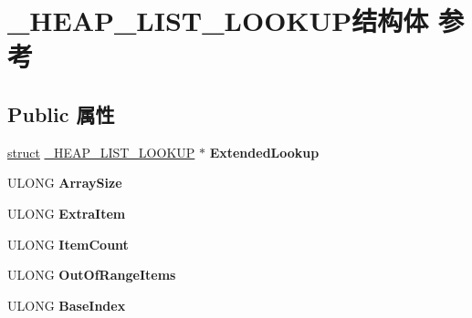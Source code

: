 \hypertarget{struct___h_e_a_p___l_i_s_t___l_o_o_k_u_p}{}\section{\+\_\+\+H\+E\+A\+P\+\_\+\+L\+I\+S\+T\+\_\+\+L\+O\+O\+K\+U\+P结构体 参考}
\label{struct___h_e_a_p___l_i_s_t___l_o_o_k_u_p}
\subsection*{Public 属性}
\begin{DoxyCompactItemize}
\item 
\mbox{\label{struct___h_e_a_p___l_i_s_t___l_o_o_k_u_p_a74a45acb81087ff88ffbf8f173f3f0d5}} 
\hyperlink{interfacestruct}{struct} \hyperlink{struct___h_e_a_p___l_i_s_t___l_o_o_k_u_p}{\+\_\+\+H\+E\+A\+P\+\_\+\+L\+I\+S\+T\+\_\+\+L\+O\+O\+K\+UP} $\ast$ {\bfseries Extended\+Lookup}
\item 
\mbox{\label{struct___h_e_a_p___l_i_s_t___l_o_o_k_u_p_aa0c1d954dd0366df30343ef7b4e45460}} 
U\+L\+O\+NG {\bfseries Array\+Size}
\item 
\mbox{\label{struct___h_e_a_p___l_i_s_t___l_o_o_k_u_p_a0a473dd9b6c07f2d1fa254ce74c97f02}} 
U\+L\+O\+NG {\bfseries Extra\+Item}
\item 
\mbox{\label{struct___h_e_a_p___l_i_s_t___l_o_o_k_u_p_ae772c1bae211514a8b61410425cff41c}} 
U\+L\+O\+NG {\bfseries Item\+Count}
\item 
\mbox{\label{struct___h_e_a_p___l_i_s_t___l_o_o_k_u_p_abed494daabac3c4aff42f93c61b33f1b}} 
U\+L\+O\+NG {\bfseries Out\+Of\+Range\+Items}
\item 
\mbox{\label{struct___h_e_a_p___l_i_s_t___l_o_o_k_u_p_a15af76f3035cb15bf4c97d37263c4097}} 
U\+L\+O\+NG {\bfseries Base\+Index}
\item 
\mbox{\label{struct___h_e_a_p___l_i_s_t___l_o_o_k_u_p_a6904d4ec6be4722362774c9352498363}} 

\end{DoxyCompactItemize}
